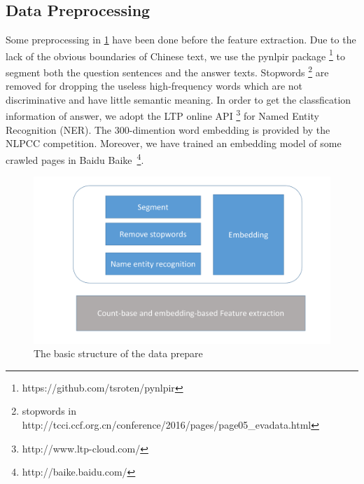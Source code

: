 \documentclass{llncs}
\begin{document}


\subsection{Data Preprocessing}
\label{sec:preprocess}
Some preprocessing in \ref{fig:structure} have been done before the feature extraction. 
Due to the lack of the obvious boundaries of Chinese text, we use the pynlpir package \footnote{https://github.com/tsroten/pynlpir} \cite{Liu2010Language} to segment both the question sentences and the answer texts. Stopwords \footnote{stopwords in http://tcci.ccf.org.cn/conference/2016/pages/page05\_evadata.html} are removed for dropping the useless high-frequency words which are not discriminative and have little semantic meaning. In order to get the classfication information of answer, we adopt the LTP online API \footnote{http://www.ltp-cloud.com/} for Named Entity Recognition (NER). The 300-dimention word embedding is provided by the NLPCC competition. Moreover, we have trained an embedding model of some crawled pages in Baidu Baike~\footnote{http://baike.baidu.com/}. 
\begin{figure}
\centering
\includegraphics[width=12cm]{figures/structure.pdf}
\caption{The basic structure of the data prepare}
\label{fig:structure}
\end{figure}
\end{document}
